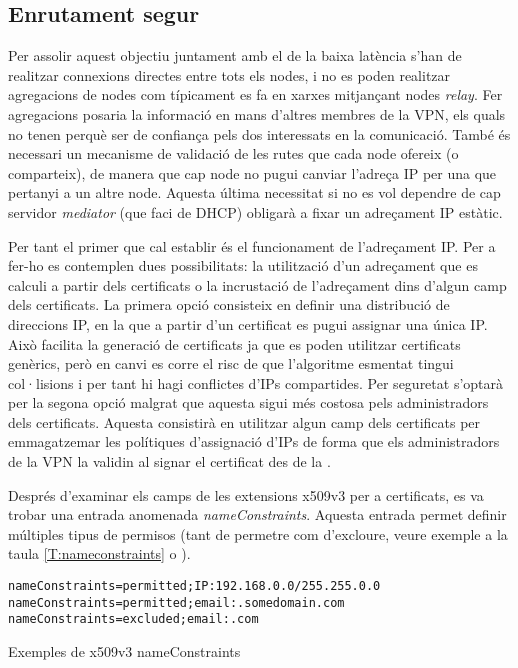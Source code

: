 \subsection{Enrutament segur}
Per assolir aquest objectiu juntament amb el de la baixa latència s'han de realitzar connexions directes entre tots els nodes, i no es poden realitzar agregacions de nodes com típicament es fa en xarxes  mitjançant nodes \emph{relay}. Fer agregacions posaria la informació en mans d'altres membres de la VPN, els quals no tenen perquè ser de confiança pels dos interessats en la comunicació. També és necessari un mecanisme de validació de les rutes que cada node ofereix (o comparteix), de manera que cap node no pugui canviar l'adreça IP per una que pertanyi a un altre node. Aquesta última necessitat si no es vol dependre de cap servidor \emph{mediator} (que faci de DHCP) obligarà a fixar un adreçament IP estàtic.

Per tant el primer que cal establir és el funcionament de l'adreçament IP. Per a fer-ho es contemplen dues possibilitats: la utilització d'un adreçament que es calculi a partir dels certificats o la incrustació de l'adreçament dins d'algun camp dels certificats.
La primera opció consisteix en definir una distribució de direccions IP, en la que a partir d'un certificat es pugui assignar una única IP. Això facilita la generació de certificats ja que es poden utilitzar certificats genèrics, però en canvi es corre el risc de que l'algoritme esmentat tingui col·lisions i per tant hi hagi conflictes d'IPs compartides. Per seguretat s'optarà per la segona opció malgrat que aquesta sigui més costosa pels administradors dels certificats. Aquesta consistirà en utilitzar algun camp dels certificats per emmagatzemar les polítiques d'assignació d'IPs de forma que els administradors de la VPN la validin al signar el certificat des de la .

Després d'examinar els camps de les extensions x509v3 per a certificats, es va trobar una entrada anomenada \emph{nameConstraints}. Aquesta entrada permet definir múltiples tipus de permisos (tant de permetre com d'excloure, veure exemple a la taula \ref{T:nameconstraints} o \cite{nameconstraints}).
\begin{table}[htb]
\begin{center}
\begin{minipage}[htb]{0.6\linewidth}
\footnotesize
\begin{verbatim}
nameConstraints=permitted;IP:192.168.0.0/255.255.0.0
nameConstraints=permitted;email:.somedomain.com
nameConstraints=excluded;email:.com
\end{verbatim}
\end{minipage}
\caption{Exemples de x509v3 nameConstraints}
\label{T:nameconstraints}
\end{center}
\end{table}

